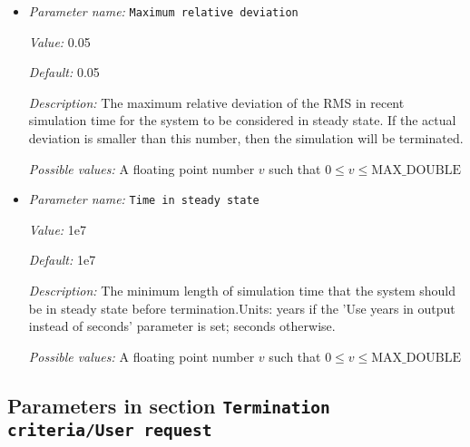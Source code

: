 \begin{itemize}
\item {\it Parameter name:} {\tt Maximum relative deviation}
\label{parameters:Termination criteria/Steady state velocity/Maximum relative deviation}
\label{parameters:Termination_20criteria/Steady_20state_20velocity/Maximum_20relative_20deviation}


{\it Value:} 0.05


{\it Default:} 0.05


{\it Description:} The maximum relative deviation of the RMS in recent simulation time for the system to be considered in steady state. If the actual deviation is smaller than this number, then the simulation will be terminated.


{\it Possible values:} A floating point number $v$ such that $0 \leq v \leq \text{MAX\_DOUBLE}$
\item {\it Parameter name:} {\tt Time in steady state}
\label{parameters:Termination criteria/Steady state velocity/Time in steady state}
\label{parameters:Termination_20criteria/Steady_20state_20velocity/Time_20in_20steady_20state}


{\it Value:} 1e7


{\it Default:} 1e7


{\it Description:} The minimum length of simulation time that the system should be in steady state before termination.Units: years if the 'Use years in output instead of seconds' parameter is set; seconds otherwise.


{\it Possible values:} A floating point number $v$ such that $0 \leq v \leq \text{MAX\_DOUBLE}$
\end{itemize}

\subsection{Parameters in section \tt Termination criteria/User request}
\label{parameters:Termination_20criteria/User_20request}

